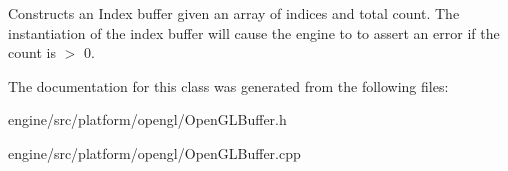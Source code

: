 Constructs an Index buffer given an array of indices and total count. The instantiation of the index buffer will cause the engine to to assert an error if the count is $>$ 0. 

The documentation for this class was generated from the following files\+:\begin{DoxyCompactItemize}
\item 
engine/src/platform/opengl/Open\+G\+L\+Buffer.\+h\item 
engine/src/platform/opengl/Open\+G\+L\+Buffer.\+cpp\end{DoxyCompactItemize}

